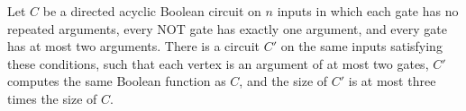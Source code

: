 \begin{theorem}
\label{BoolCircuit.DAGCircuit.exists_fanoutTwo}
\leanok
{}
Let $C$ be a directed acyclic Boolean circuit on $n$ inputs in which each gate has no
repeated arguments, every NOT gate has exactly one argument, and every gate has at most
two arguments. There is a circuit $C'$ on the same inputs satisfying these conditions,
such that each vertex is an argument of at most two gates, $C'$ computes the same
Boolean function as $C$, and the size of $C'$ is at most three times the size of $C$.
\end{theorem}
